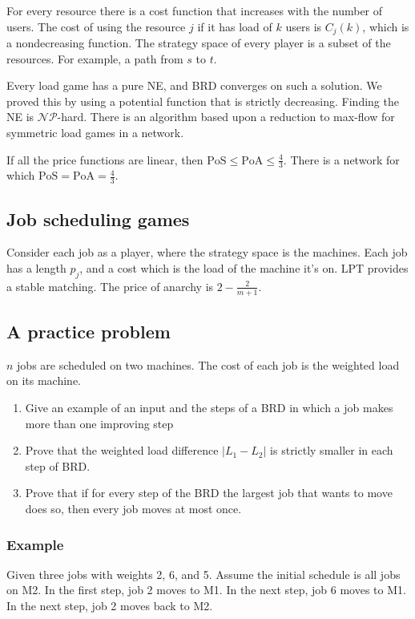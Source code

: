 \documentclass{idc_msc}
\newcommand{\NPclass}{\mathcal{NP}}
\begin{document}
For every resource there is a cost function that increases with the number of users.
The cost of using the resource \(j\) if it has load of \(k\) users is \(C_j(k)\), which is a nondecreasing function.
The strategy space of every player is a subset of the resources.
For example, a path from \(s\) to \(t\).

Every load game has a pure NE, and BRD converges on such a solution.
We proved this by using a potential function that is strictly decreasing.
Finding the NE is \(\NPclass\)-hard.
There is an algorithm based upon a reduction to max-flow for symmetric load games in a network.

If all the price functions are linear, then \(\text{PoS} \le \text{PoA} \le \frac{4}{3}\).
There is a network for which \(\text{PoS} = \text{PoA} = \frac{4}{3}\).

\subsection{Job scheduling games}

Consider each job as a player, where the strategy space is the machines.
Each job has a length \(p_j\), and a cost which is the load of the machine it's on.
LPT provides a stable matching.
The price of anarchy is \(2-\frac{2}{m+1}\).

\subsection{A practice problem}

\(n\) jobs are scheduled on two machines.
The cost of each job is the weighted load on its machine.

\begin{enumerate}
  \item Give an example of an input and the steps of a BRD in which a job makes more than one improving step
  \item Prove that the weighted load difference \(|L_1 - L_2|\) is strictly smaller in each step of BRD.
  \item Prove that if for every step of the BRD the largest job that wants to move does so, then every job moves at most once.
\end{enumerate}

\subsubsection{Example}

Given three jobs with weights 2, 6, and 5.
Assume the initial schedule is all jobs on M2.
In the first step, job 2 moves to M1.
In the next step, job 6 moves to M1.
In the next step, job 2 moves back to M2.
\end{document}
